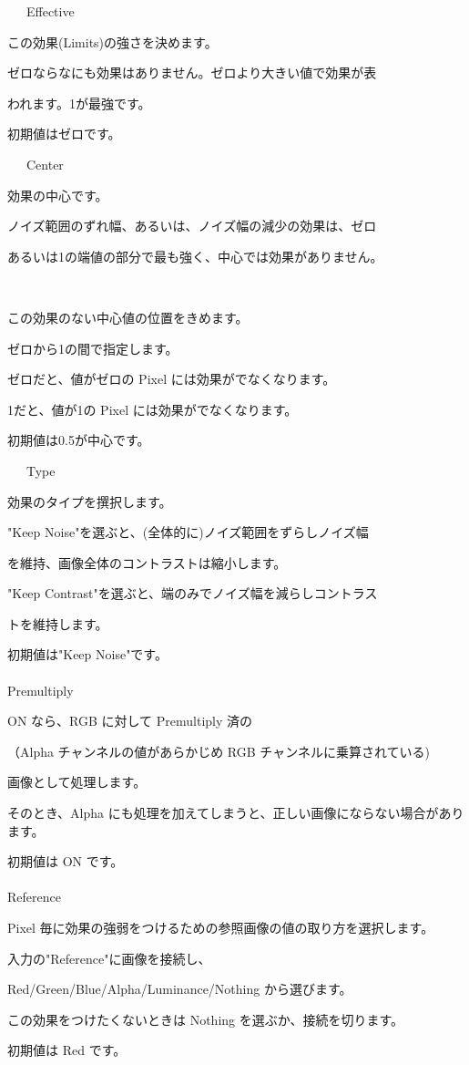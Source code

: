 \documentclass[a4paper,12pt]{article}
\begin{document}
\par
\noindent \ \ \, Effective\par
この効果(Limits)の強さを決めます。\par
ゼロならなにも効果はありません。ゼロより大きい値で効果が表\par
われます。1が最強です。\par
初期値はゼロです。\\
\par
\noindent \ \ \, Center\par
効果の中心です。\par
ノイズ範囲のずれ幅、あるいは、ノイズ幅の減少の効果は、ゼロ\par
あるいは1の端値の部分で最も強く、中心では効果がありません。

\newpage

\thispagestyle{empty}

\ \vspace{-0.2em}
\par
この効果のない中心値の位置をきめます。\par
ゼロから1の間で指定します。\par
ゼロだと、値がゼロの Pixel には効果がでなくなります。\par
1だと、値が1の Pixel には効果がでなくなります。\par
初期値は0.5が中心です。\\
\par
\noindent \ \ \, Type\par
効果のタイプを撰択します。\par
"Keep Noise"を選ぶと、(全体的に)ノイズ範囲をずらしノイズ幅\par
を維持、画像全体のコントラストは縮小します。\par
"Keep Contrast"を選ぶと、端のみでノイズ幅を減らしコントラス\par
トを維持します。\par
初期値は"Keep Noise"です。\\
\\
Premultiply\par
ON なら、RGB に対して Premultiply 済の\par
（Alpha チャンネルの値があらかじめ RGB チャンネルに乗算されている)\par
画像として処理します。\par
そのとき、Alpha にも処理を加えてしまうと、正しい画像にならない場合があります。\par
初期値は ON です。\\
\\
Reference\par
Pixel 毎に効果の強弱をつけるための参照画像の値の取り方を選択します。\par
入力の"Reference"に画像を接続し、\par
Red/Green/Blue/Alpha/Luminance/Nothing から選びます。\par
この効果をつけたくないときは Nothing を選ぶか、接続を切ります。\par
初期値は Red です。
\end{document}
